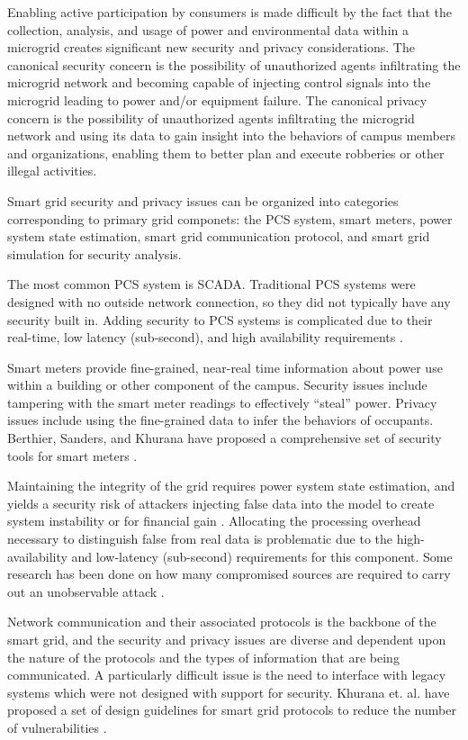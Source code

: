 Enabling active participation by consumers is made difficult by the fact
that the collection, analysis, and usage of power and environmental data
within a microgrid creates significant new security and privacy
considerations.  The canonical security concern is the possibility of
unauthorized agents infiltrating the microgrid network and becoming capable
of injecting control signals into the microgrid leading to power and/or
equipment failure.  The canonical privacy concern is the possibility of
unauthorized agents infiltrating the microgrid network and using its data
to gain insight into the behaviors of campus members and organizations,
enabling them to better plan and execute robberies or other illegal
activities.

Smart grid security and privacy issues can be organized into categories
corresponding to primary grid componets: the PCS system, smart meters,
power system state estimation, smart grid communication protocol, and smart
grid simulation for security analysis. 

The most common PCS system is SCADA.  Traditional PCS systems were designed
with no outside network connection, so they did not typically have any
security built in.  Adding security to PCS systems is complicated due to
their real-time, low latency (sub-second), and high availability
requirements \cite{Valdes2009}. 

Smart meters provide fine-grained, near-real time information about power
use within a building or other component of the campus.  Security issues
include tampering with the smart meter readings to effectively ``steal''
power. Privacy issues include using the fine-grained data to infer the
behaviors of occupants. Berthier, Sanders, and Khurana have proposed a
comprehensive set of security tools for smart meters \cite{Berthier2010}.

Maintaining the integrity of the grid requires power system state
estimation, and yields a security risk of attackers injecting false data
into the model to create system instability or for financial gain
\cite{Xie2010}.  Allocating the processing overhead necessary to
distinguish false from real data is problematic due to the
high-availability and low-latency (sub-second) requirements for this
component. Some research has been done on how many compromised sources are
required to carry out an unobservable attack \cite{Kosut2010}.

Network communication and their associated protocols is the backbone of the
smart grid, and the security and privacy issues are diverse and dependent
upon the nature of the protocols and the types of information that are
being communicated. A particularly difficult issue is the need to interface
with legacy systems which were not designed with support for security.
Khurana et. al. have proposed a set of design guidelines for smart grid
protocols to reduce the number of vulnerabilities \cite{Khurana2010}.

